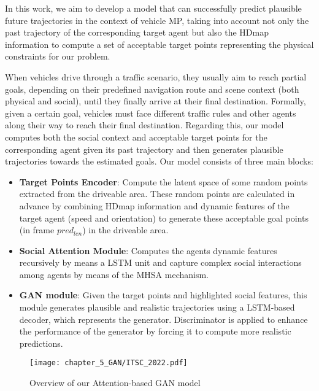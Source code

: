 In this work, we aim to develop a model \cite{gomez2022exploring} that can successfully predict plausible future trajectories in the context of vehicle \ac{MP}, taking into account not only the past trajectory of the corresponding target agent but also the \ac{HDmap} information to compute a set of acceptable target points representing the physical constraints for our problem.

When vehicles drive through a traffic scenario, they usually aim to reach partial goals, depending on their predefined navigation route and scene context (both physical and social), until they finally arrive at their final destination. Formally, given a certain goal, vehicles must face different traffic rules and other agents along their way to reach their final destination. Regarding this, our model computes both the social context and acceptable target points for the corresponding agent given its past trajectory and then generates plausible trajectories towards the estimated goals. Our model consists of three main blocks:

\begin{itemize}
	
	\item \textbf{Target Points Encoder}: Compute the latent space of some random points extracted from the driveable area. These random points are calculated in advance by combining \ac{HDmap} information and dynamic features of the target agent (speed and orientation) to generate these acceptable goal points (in frame \textit{$pred_{len}$}) in the driveable area.
	
	\item \textbf{Social Attention Module}: Computes the agents dynamic features recursively by means a \ac{LSTM} unit and capture complex social interactions among agents by means of the \ac{MHSA} mechanism.
	
	\item \textbf{\ac{GAN} module}: Given the target points and highlighted social features, this module generates plausible and realistic trajectories using a \ac{LSTM}-based decoder, which represents the generator. Discriminator is applied to enhance the performance of the generator by forcing it to compute more realistic predictions.
	
\end{itemize} 

\begin{figure}[h] 
	\centering
	\texttt{[image: chapter\_5\_GAN/ITSC\_2022.pdf]}
	\caption{Overview of our Attention-based \ac{GAN} model}
	\label{fig:chapter_5_GAN/ITSC_2022}
\end{figure}

